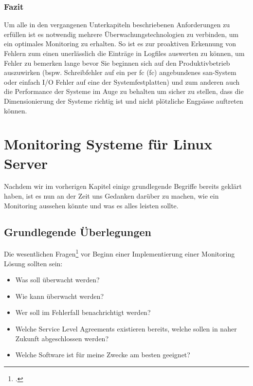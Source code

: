 \documentclass[12pt,a4paper,parskip]{scrreprt}
\begin{document}
	\subsection{Fazit}
	Um alle in den vergangenen Unterkapiteln beschriebenen Anforderungen zu erfüllen ist es notwendig mehrere Überwachungstechnologien zu verbinden, um ein optimales Monitoring zu erhalten. So ist es zur proaktiven Erkennung von Fehlern zum einen unerlässlich die Einträge in Logfiles auswerten zu können, um Fehler zu bemerken lange bevor Sie beginnen sich auf den Produktivbetrieb auszuwirken (bspw. Schreibfehler auf ein per \acrlong{fc} (\acrshort{fc}) angebundenes \gls{san}-System oder einfach I/O Fehler auf eine der Systemfestplatten) und zum anderen auch die Performance der Systeme im Auge zu behalten um sicher zu stellen, dass die Dimensionierung der Systeme richtig ist und nicht plötzliche Engpässe auftreten können.
	\chapter{Monitoring Systeme für Linux Server}

	Nachdem wir im vorherigen Kapitel einige grundlegende Begriffe bereits geklärt haben, ist es nun an der Zeit uns Gedanken darüber zu machen, wie ein Monitoring aussehen könnte und was es alles leisten sollte. 
	\section{Grundlegende Überlegungen}
	Die wesentlichen Fragen\footcite[nach][]{veltnagios1} vor Beginn einer Implementierung einer Monitoring Lösung sollten sein:
	\begin{itemize}
		\item Was soll überwacht werden?
		\item Wie kann überwacht werden?
		\item Wer soll im Fehlerfall benachrichtigt werden?
		\item Welche Service Level Agreements existieren bereits, welche sollen in naher Zukunft abgeschlossen werden?
		\item Welche Software ist für meine Zwecke am besten geeignet?
	\end{itemize}
\end{document}
